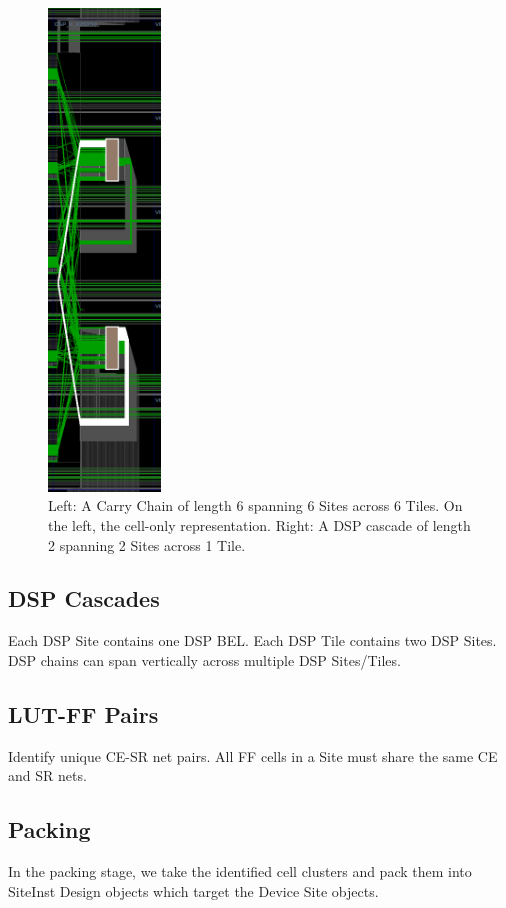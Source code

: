 \documentclass[twocolumn]{article}
\begin{document}
\begin{figure}
                \includegraphics[width=3.0cm]{figures/dsp_cascade_routes.png}
                \caption{Left: A Carry Chain of length 6 spanning 6 Sites across 6 Tiles. On the left, the cell-only representation. Right: A DSP cascade of length 2 spanning 2 Sites across 1 Tile.}
                \label{fig:device_carry_chain_routing}
            \end{figure}

        \subsection{DSP Cascades}
            Each DSP Site contains one DSP BEL.
            Each DSP Tile contains two DSP Sites.
            DSP chains can span vertically across multiple DSP Sites/Tiles.

        \subsection{LUT-FF Pairs}
            Identify unique CE-SR net pairs. All FF cells in a Site must share the same CE and SR nets.
    \subsection{Packing}
        In the packing stage, we take the identified cell clusters and pack them into SiteInst Design objects which target the Device Site objects.
\end{document}
